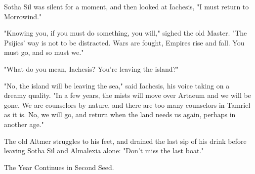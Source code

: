 Sotha Sil was silent for a moment, and then looked at Iachesis, "I must return to Morrowind."

"Knowing you, if you must do something, you will," sighed the old Master. "The Psijics' way is not to be distracted. Wars are fought, Empires rise and fall. You must go, and so must we."

"What do you mean, Iachesis? You're leaving the island?"

"No, the island will be leaving the sea," said Iachesis, his voice taking on a dreamy quality. "In a few years, the mists will move over Artaeum and we will be gone. We are counselors by nature, and there are too many counselors in Tamriel as it is. No, we will go, and return when the land needs us again, perhaps in another age."

The old Altmer struggles to his feet, and drained the last sip of his drink before leaving Sotha Sil and Almalexia alone: "Don't miss the last boat."

The Year Continues in Second Seed.